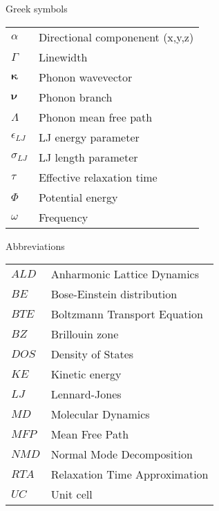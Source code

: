 Greek symbols\\
\begin{longtable}{ l l }
$\alpha$ & Directional componenent (x,y,z)\\
$\Gamma$ & Linewidth\\
$\pmb{\kappa}$ & Phonon wavevector\\ 
$\pmb{\nu}$ & Phonon branch\\
$\Lambda$ & Phonon mean free path\\
$\epsilon_{LJ}$ & LJ energy parameter\\
$\sigma_{LJ}$ & LJ length parameter\\
$\tau$ & Effective relaxation time\\ 
$\Phi$ & Potential energy\\
$\omega$ & Frequency\\
\end{longtable}

Abbreviations\\
\begin{longtable}{ l l }
$ALD$ & Anharmonic Lattice Dynamics \\
$BE$ & Bose-Einstein distribution \\
$BTE$ & Boltzmann Transport Equation \\
$BZ$ & Brillouin zone \\
$DOS$ & Density of States \\
$KE$ & Kinetic energy\\
$LJ$ & Lennard-Jones\\
$MD$ & Molecular Dynamics\\
$MFP$ & Mean Free Path\\
$NMD$ & Normal Mode Decomposition\\
$RTA$ & Relaxation Time Approximation\\
$UC$ & Unit cell\\
\end{longtable}
